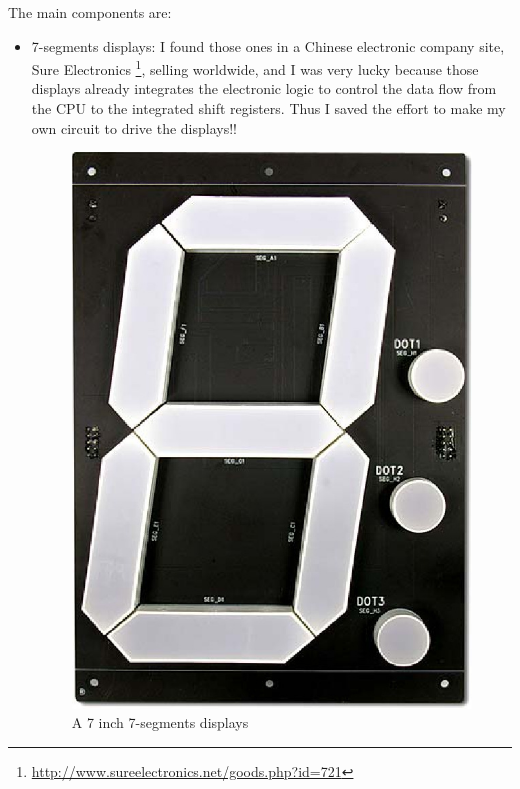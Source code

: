 \documentclass[11pt,english]{article}
\begin{document}
The main components are:

\begin{itemize}
 \item 7-segments displays: I found those ones in a Chinese electronic company site, 
 Sure Electronics \footnote{\url{http://www.sureelectronics.net/goods.php?id=721}}, 
 selling worldwide, and I was very lucky because those displays already integrates the 
 electronic logic to  control the data flow from the CPU to the integrated shift registers. 
 Thus I saved the  effort to make my own circuit to drive the displays!!
 
  \begin{figure}[H]
  \centering\includegraphics[scale=0.25]{img/7-inch-dis}

  \caption{A 7 inch 7-segments displays \label{fig:7-inch-dis}}

  \end{figure}
  

\end{itemize}
\end{document}
